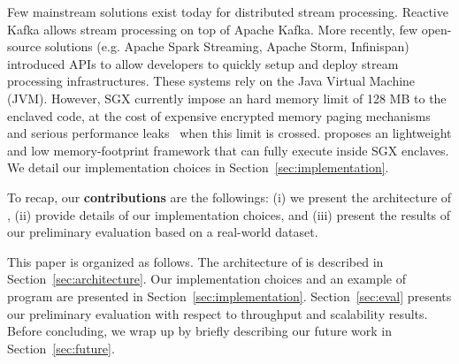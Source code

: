 Few mainstream solutions exist today for distributed stream processing.
Reactive Kafka\cite{reactivekafka} allows stream processing on top of Apache Kafka\cite{apachekafka}.
More recently, few open-source solutions (e.g. Apache Spark Streaming\cite{apachesparkstreaming}, Apache Storm\cite{apachestorm}, Infinispan\cite{infinispan}) introduced APIs to allow developers to quickly setup and deploy stream processing infrastructures.
These systems rely on the Java Virtual Machine (JVM)\cite{lindholm2014java}.
However, SGX currently impose an hard memory limit of 128 MB to the enclaved code, at the cost of expensive encrypted memory paging mechanisms and serious performance leaks~\cite{brenner_securekeeper:_2016} when this limit is crossed.
\SYS proposes an lightweight and low memory-footprint framework that can fully execute inside SGX enclaves.
We detail our implementation choices in Section~\ref{sec:implementation}.

To recap, our \textbf{contributions} are the followings: (i) we present the architecture of \SYS, (ii) provide details of our implementation choices, and (iii) present the results of our preliminary evaluation based on a real-world dataset.

This paper is organized as follows.
The architecture of \SYS is described in Section~\ref{sec:architecture}.
Our implementation choices and an example of \SYS program are presented in Section~\ref{sec:implementation}.
Section~\ref{sec:eval} presents our preliminary evaluation with respect to throughput and scalability results.
Before concluding, we wrap up by briefly describing our future work in Section~\ref{sec:future}.
